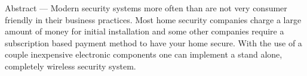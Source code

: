 {\small\bf
	\par Abstract — Modern security systems more often than are not very consumer friendly in their business practices. Most home security companies charge a large amount of money for initial installation and some other companies require a subscription based payment method to have your home secure. With the use of a couple inexpensive electronic components one can implement a stand alone, completely wireless security system. 
}